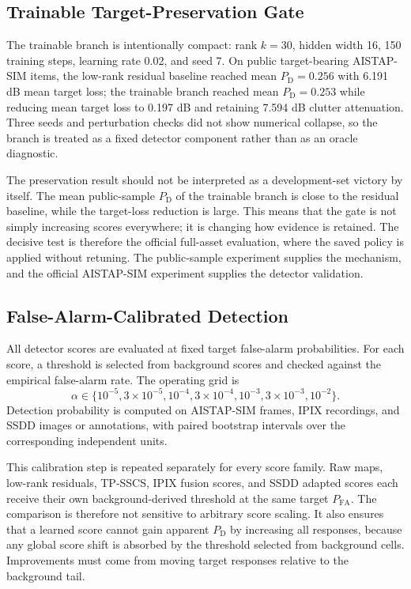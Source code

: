 \documentclass[journal]{IEEEtran}
\begin{document}
\subsection{Trainable Target-Preservation Gate}

The trainable branch is intentionally compact: rank $k=30$, hidden width 16, 150 training steps, learning rate 0.02, and seed 7. On public target-bearing AISTAP-SIM items, the low-rank residual baseline reached mean $P_{\mathrm{D}}=0.256$ with 6.191 dB mean target loss; the trainable branch reached mean $P_{\mathrm{D}}=0.253$ while reducing mean target loss to 0.197 dB and retaining 7.594 dB clutter attenuation. Three seeds and perturbation checks did not show numerical collapse, so the branch is treated as a fixed detector component rather than as an oracle diagnostic.

The preservation result should not be interpreted as a development-set victory by itself. The mean public-sample $P_{\mathrm{D}}$ of the trainable branch is close to the residual baseline, while the target-loss reduction is large. This means that the gate is not simply increasing scores everywhere; it is changing how evidence is retained. The decisive test is therefore the official full-asset evaluation, where the saved policy is applied without retuning. The public-sample experiment supplies the mechanism, and the official AISTAP-SIM experiment supplies the detector validation.

\subsection{False-Alarm-Calibrated Detection}

All detector scores are evaluated at fixed target false-alarm probabilities. For each score, a threshold is selected from background scores and checked against the empirical false-alarm rate. The operating grid is
\begin{equation}
    \alpha \in \{10^{-5}, 3\times10^{-5}, 10^{-4}, 3\times10^{-4},
    10^{-3}, 3\times10^{-3}, 10^{-2}\}.
\end{equation}
Detection probability is computed on AISTAP-SIM frames, IPIX recordings, and SSDD images or annotations, with paired bootstrap intervals over the corresponding independent units.

This calibration step is repeated separately for every score family. Raw maps, low-rank residuals, TP-SSCS, IPIX fusion scores, and SSDD adapted scores each receive their own background-derived threshold at the same target $P_{\mathrm{FA}}$. The comparison is therefore not sensitive to arbitrary score scaling. It also ensures that a learned score cannot gain apparent $P_{\mathrm{D}}$ by increasing all responses, because any global score shift is absorbed by the threshold selected from background cells. Improvements must come from moving target responses relative to the background tail.
\end{document}
